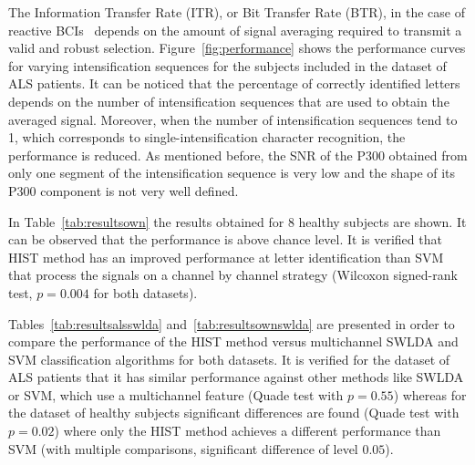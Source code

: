\documentclass[utf8]{frontiersSCNS} %
\begin{document}

The Information Transfer Rate (ITR), or Bit Transfer Rate (BTR), in the case of reactive BCIs~\citep{WolpawJonathanR2012}  depends on the amount of signal averaging required to transmit a valid and robust selection.  Figure~\ref{fig:performance} shows the performance curves for varying intensification sequences for the subjects included in the dataset of ALS patients. It can be noticed that the percentage of correctly identified letters depends on the number of intensification sequences that are used to obtain the averaged signal.  Moreover, when the number of intensification sequences tend to 1, which corresponds to single-intensification character recognition, the performance is reduced. As mentioned before, the SNR of the P300 obtained from only one segment of the intensification sequence is very low and the shape of its P300 component is not very well defined.

In Table~\ref{tab:resultsown} the results obtained for 8 healthy subjects are shown.  It can be observed that the performance is above chance level. It is verified that HIST method has an improved performance at letter identification than SVM that process the signals on a channel by channel strategy (Wilcoxon signed-rank test, $p =  0.004$ for both datasets).

Tables~\ref{tab:resultsalsswlda} and~\ref{tab:resultsownswlda} are presented in order to compare the performance of the HIST method versus  multichannel SWLDA and SVM classification algorithms for both datasets.   It is verified for the dataset of ALS patients that it has similar performance  against other methods like SWLDA or SVM, which use a multichannel feature (Quade test with $p=0.55$) whereas for the dataset of healthy subjects significant differences are found (Quade test with $p=0.02$) where only the HIST method achieves a different performance than SVM (with multiple comparisons, significant difference of level $0.05$).

 
\end{document}
